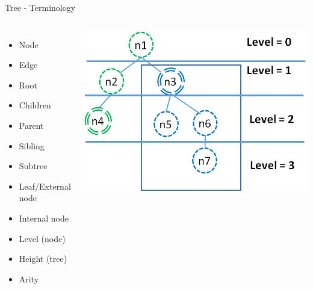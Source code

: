 \documentclass{beamer}
\begin{document}
\begin{frame}{Tree - Terminology}

\begin{columns}
            \begin{itemize}
            \item Node
            \item Edge
            \item Root
            \item Children 
            \item Parent 
            \item Sibling
            \item Subtree
            \item Leaf/External node
            \item Internal node
            \item Level (node) 
            \item Height (tree)
            \item Arity
            \end{itemize}
        \begin{center}
            \includegraphics[scale=0.3]{treeTerminology.png}
        \end{center}
\end{columns}
\end{frame}
\end{document}

